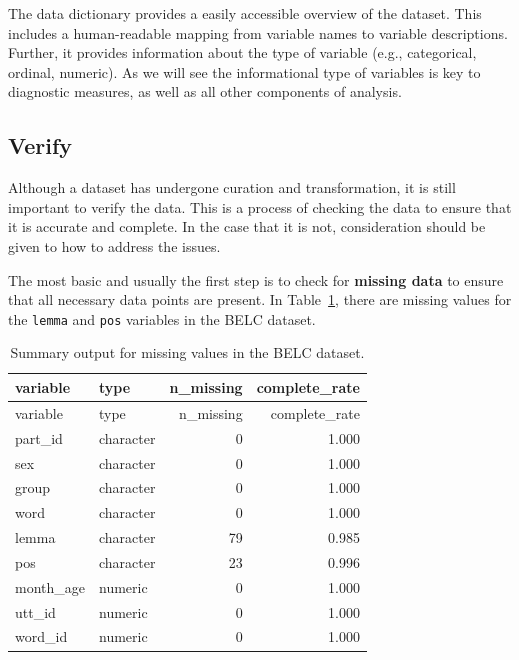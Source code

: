\documentclass[
  letterpaper,
  DIV=11,
  numbers=noendperiod]{scrreport}
\theoremstyle{definition}
\theoremstyle{remark}
\begin{document}
The data dictionary provides a easily accessible overview of the
dataset. This includes a human-readable mapping from variable names to
variable descriptions. Further, it provides information about the type
of variable (e.g., categorical, ordinal, numeric). As we will see the
informational type of variables is key to diagnostic measures, as well
as all other components of analysis.

\hypertarget{sec-aa-verfiy}{%
\subsection{Verify}\label{sec-aa-verfiy}}

Although a dataset has undergone curation and transformation, it is
still important to verify the data. This is a process of checking the
data to ensure that it is accurate and complete. In the case that it is
not, consideration should be given to how to address the issues.

The most basic and usually the first step is to check for
\textbf{missing data} to ensure that all necessary data points are
present. In Table~\ref{tbl-aa-belc-skim-missing}, there are missing
values for the \texttt{lemma} and \texttt{pos} variables in the BELC
dataset.

\hypertarget{tbl-aa-belc-skim-missing}{}
\begin{longtable}[]{@{}llrr@{}}
\caption{\label{tbl-aa-belc-skim-missing}Summary output for missing
values in the BELC dataset.}\tabularnewline
\toprule\noalign{}
variable & type & n\_missing & complete\_rate \\
\midrule\noalign{}
\endfirsthead
\toprule\noalign{}
variable & type & n\_missing & complete\_rate \\
\midrule\noalign{}
\endhead
\bottomrule\noalign{}
\endlastfoot
part\_id & character & 0 & 1.000 \\
sex & character & 0 & 1.000 \\
group & character & 0 & 1.000 \\
word & character & 0 & 1.000 \\
lemma & character & 79 & 0.985 \\
pos & character & 23 & 0.996 \\
month\_age & numeric & 0 & 1.000 \\
utt\_id & numeric & 0 & 1.000 \\
word\_id & numeric & 0 & 1.000 \\
\end{longtable}
\end{document}
